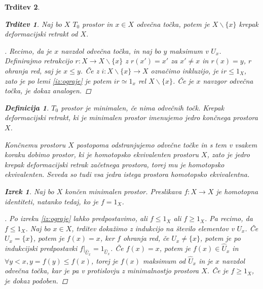\documentclass[a4paper,12pt]{article}
\theoremstyle{definition}
\newtheorem{definicija}{Definicija}
\theoremstyle{plain}
\newtheorem{izrek}{Izrek}
\theoremstyle{definition}
\theoremstyle{plain}
\newtheorem{trditev}{Trditev}
\theoremstyle{plain}
\theoremstyle{plain}
\theoremstyle{plain}
\newenvironment{dokaz}{\begin{proof}[\bfseries\upshape\proofname]}{\end{proof}}
\begin{document}
\begin{trditev}
\begin{trditev}
Naj bo $X$ $T_0$ prostor in $x\in X$ odvečna točka, potem je $X\backslash \{x\}$ krepak deformacijski retrakt od $X$.
\end{trditev}

\begin{dokaz}
Recimo, da je $x$ navzdol odvečna točka, in naj bo $y$ 
maksimum v $U_x$. Definirajmo retrakcijo $r:X\rightarrow 
X\backslash \{x\}$ z $r(x')=x'$ za $x'\neq x$ in $r(x)=y$, 
$r$ ohranja red, saj je $x\leq y$. Če z $i:X\backslash\{x\} 
\rightarrow X$ označimo inkluzijo, je $ir\leq 1_X$, zato je 
po lemi \ref{iz:ograje} je potem $ir \simeq 1_x$ rel 
$X\backslash\{x\}$. Če je $x$ navzgor odvečna točka, je 
dokaz analogen.
\end{dokaz}

\begin{definicija}
    $T_0$ prostor je \textit{minimalen}, če nima odvečnih točk. Krepak deformacijski retrakt, ki je minimalen prostor imenujemo \textit{jedro} končnega prostora $X$.
\end{definicija}

Končnemu prostoru $X$ postopoma odstranjujemo odvečne točke in s tem v vsakem koraku dobimo prostor, ki je homotopsko ekvivalenten prostoru $X$, zato je jedro krepak deformacijski retrak začetnega prostora, torej mu je homotopsko ekvivalenten. Seveda so tudi vsa jedra istega prostora homotopsko ekvivalentna.

\begin{izrek}
    \label{iz:identiteta}
    Naj bo $X$ končen minimalen prostor. Preslikava $f:X\rightarrow X$ je homotopna identiteti, natanko tedaj, ko je $f=1_X$.
\end{izrek}

\begin{dokaz}
    Po izreku \ref{iz:ograje} lahko predpostavimo, ali 
    $f\leq 1_X$ ali $f\geq 1_X$. %
    Pa recimo, da $f\leq 1_X$. 
    Naj bo $x\in X$, trditev dokažimo z indukcijo na 
    število elementov v $U_x$. Če $U_x=\{x\}$, potem je 
    $f(x)=x$, ker $f$ ohranja red, če $U_x\neq\{x\}$, potem 
    je po indukcijski predpostavki 
    $f|_{\hat{U}_x}=1_{\hat{U}_x}$. Če $f(x)=x$, potem je 
    $f(x)\in \hat{U}_x$ in $\forall y < x, y=f(y)\leq 
    f(x)$, torej je $f(x)$ maksimum od $\hat{U}_x$ in je 
    $x$ navzdol odvečna točka, kar je pa v protislovju 
    z minimalnostjo prostora $X$. Če je $f\geq 1_X$, je 
    dokaz podoben.
\end{dokaz}


\end{trditev}
\end{document}
